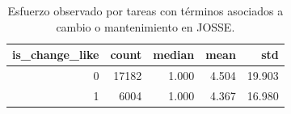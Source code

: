 \begin{table}
\caption{Esfuerzo observado por tareas con términos asociados a cambio o mantenimiento en JOSSE.}
\label{tab:change_like}
\begin{tabular}{rrrrr}
\toprule
is_change_like & count & median & mean & std \\
\midrule
0 & 17182 & 1.000 & 4.504 & 19.903 \\
1 & 6004 & 1.000 & 4.367 & 16.980 \\
\bottomrule
\end{tabular}
\end{table}
